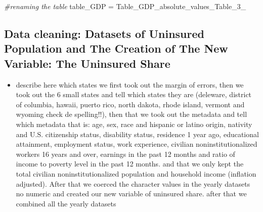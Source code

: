 \documentclass[
]{article}
\newenvironment{Shaded}{\begin{snugshade}}{\end{snugshade}}
\newcommand{\CommentTok}[1]{\textcolor[rgb]{0.56,0.35,0.01}{\textit{#1}}}
\newcommand{\NormalTok}[1]{#1}
\newcommand{\OtherTok}[1]{\textcolor[rgb]{0.56,0.35,0.01}{#1}}
\providecommand{\tightlist}{%
  \setlength{\itemsep}{0pt}\setlength{\parskip}{0pt}}
\begin{document}
\begin{Shaded}
\begin{Highlighting}[]
\CommentTok{\#renaming the table}
\NormalTok{table\_GDP }\OtherTok{=}\NormalTok{ Table\_GDP\_absolute\_values\_Table\_3\_}
\end{Highlighting}
\end{Shaded}

\subsection{Data cleaning: Datasets of Uninsured Population and The
Creation of The New Variable: The Uninsured
Share}\label{data-cleaning-datasets-of-uninsured-population-and-the-creation-of-the-new-variable-the-uninsured-share}

\begin{itemize}
\tightlist
\item
  describe here which states we first took out the margin of errors,
  then we took out the 6 small states and tell which states they are
  (deleware, district of columbia, hawaii, puerto rico, north dakota,
  rhode island, vermont and wyoming check de spelling!!), then that we
  took out the metadata and tell which metadata that is: age, sex, race
  and hispanic or latino origin, nativity and U.S. citizenship status,
  disability status, residence 1 year ago, educational attainment,
  employment status, work experience, civilian noninstitutionalized
  workers 16 years and over, earnings in the past 12 months and ratio of
  income to poverty level in the past 12 months. and that we only kept
  the total civilian noninstitutionalized population and household
  income (inflation adjusted). After that we coerced the character
  values in the yearly datasets no numeric and created our new variable
  of uninsured share. after that we combined all the yearly datasets
\end{itemize}
\end{document}
